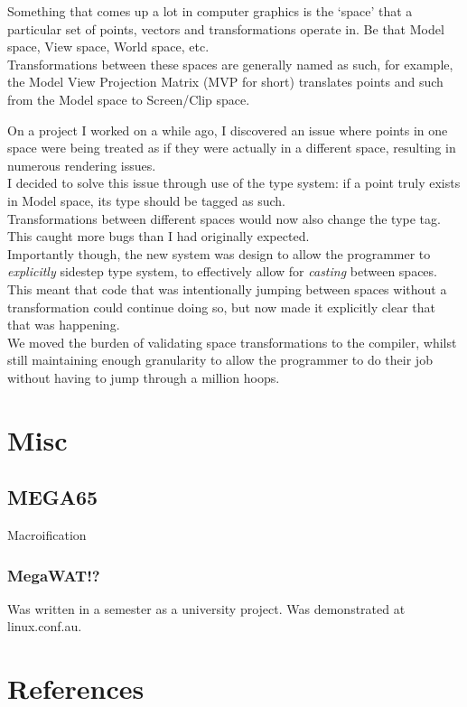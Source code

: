 \documentclass{article}
\begin{document}
Something that comes up a lot in computer graphics is the `space' that a
particular set of points, vectors and transformations operate in.
Be that Model space, View space, World space, etc. \\
Transformations between these spaces are generally named as such,
for example, the Model View Projection Matrix (MVP for short) translates points
and such from the Model space to Screen/Clip space.

On a project I worked on a while ago, I discovered an issue where points in
one space were being treated as if they were actually in a different space,
resulting in numerous rendering issues. \\
I decided to solve this issue through use of the type system:
if a point truly exists in Model space, its type should be tagged as such. \\
Transformations between different spaces would now also change the type tag.
This caught more bugs than I had originally expected. \\
Importantly though, the new system was design to allow the programmer to
\emph{explicitly} sidestep type system, to effectively allow for \emph{casting}
between spaces. \\
This meant that code that was intentionally jumping between spaces without
a transformation could continue doing so,
but now made it explicitly clear that that was happening. \\
We moved the burden of validating space transformations to the compiler,
whilst still maintaining enough granularity\cite{complexity-and-granularity}
to allow the programmer to do their job without having to jump through a
million hoops.

\section[misc]{Misc}

\cite{100-rabbits}
\cite{xxiivv}
\cite{plan-9}

\subsection[mega65]{MEGA65}

Macroification
\cite{understandable-computers}
\cite{fpga-based-mobile-phone}
\cite{megawat}

\subsubsection[megawat]{MegaWAT!?}

Was written in a semester as a university project\cite{megawat}.
Was demonstrated at linux.conf.au\cite{fpga-based-mobile-phone}.

\newpage

\section[references]{References}



\end{document}
